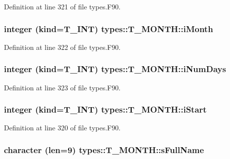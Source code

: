 Definition at line 321 of file types.F90.

\hypertarget{typetypes_1_1_t___m_o_n_t_h_ad94b74db48b815e971228babd4493268}{
\subsubsection[{iMonth}]{\setlength{\rightskip}{0pt plus 5cm}integer (kind={\bf T\_\-INT}) {\bf types::T\_\-MONTH::iMonth}}}
\label{typetypes_1_1_t___m_o_n_t_h_ad94b74db48b815e971228babd4493268}


Definition at line 322 of file types.F90.

\hypertarget{typetypes_1_1_t___m_o_n_t_h_a6ad9e3c56c7513a3987e7ebdf83a681b}{
\subsubsection[{iNumDays}]{\setlength{\rightskip}{0pt plus 5cm}integer (kind={\bf T\_\-INT}) {\bf types::T\_\-MONTH::iNumDays}}}
\label{typetypes_1_1_t___m_o_n_t_h_a6ad9e3c56c7513a3987e7ebdf83a681b}


Definition at line 323 of file types.F90.

\hypertarget{typetypes_1_1_t___m_o_n_t_h_a733335db8b7d333bb0b8f87edcffea8b}{
\subsubsection[{iStart}]{\setlength{\rightskip}{0pt plus 5cm}integer (kind={\bf T\_\-INT}) {\bf types::T\_\-MONTH::iStart}}}
\label{typetypes_1_1_t___m_o_n_t_h_a733335db8b7d333bb0b8f87edcffea8b}


Definition at line 320 of file types.F90.

\hypertarget{typetypes_1_1_t___m_o_n_t_h_a3a310b2c615c0f8cd877951ff51ef450}{
\subsubsection[{sFullName}]{\setlength{\rightskip}{0pt plus 5cm}character (len=9) {\bf types::T\_\-MONTH::sFullName}}}
\label{typetypes_1_1_t___m_o_n_t_h_a3a310b2c615c0f8cd877951ff51ef450}


